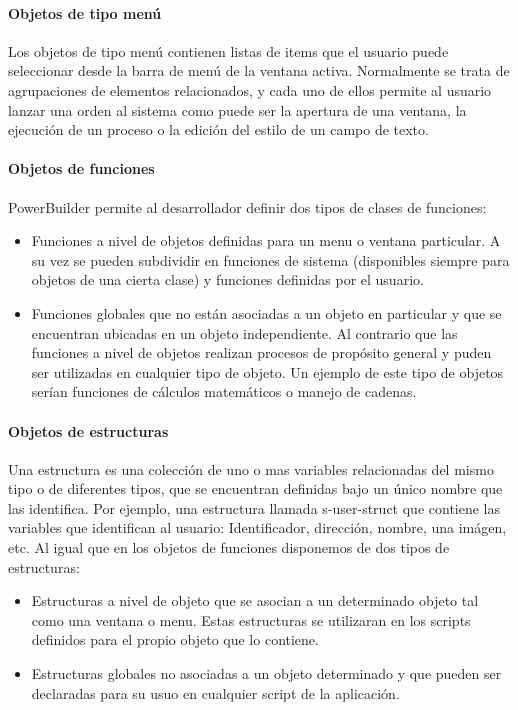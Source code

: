 {\paragraph{Objetos de tipo menú}
Los objetos de tipo menú contienen listas de items que el usuario puede seleccionar desde la barra de menú de la ventana activa. Normalmente se trata de agrupaciones de elementos 
relacionados, y cada uno de ellos permite al usuario lanzar una orden al sistema como puede ser la apertura de una ventana, la ejecución de un proceso o la edición del estilo de un campo de texto.
\paragraph{Objetos de funciones}
PowerBuilder permite al desarrollador definir dos tipos de clases de funciones: 
\begin{itemize}
 \item Funciones a nivel de objetos definidas para un menu o ventana particular. A su vez se pueden subdividir en funciones de sistema 
 (disponibles siempre para objetos de una cierta clase) y funciones definidas por el usuario.
 \item Funciones globales que no están asociadas a un objeto en particular y que se encuentran ubicadas en un objeto independiente. Al contrario que las funciones a nivel de objetos
 realizan procesos de propósito general y puden ser utilizadas en cualquier tipo de objeto. Un ejemplo de este tipo de objetos serían funciones de cálculos matemáticos o manejo de cadenas. 
\end{itemize}
\paragraph{Objetos de estructuras}
Una estructura es una colección de uno o mas variables relacionadas del mismo tipo o de diferentes tipos, que se encuentran definidas bajo un único nombre que las identifica.
Por ejemplo, una estructura llamada s-user-struct que contiene las variables que identifican al usuario: Identificador, dirección, nombre, una imágen, etc.
Al igual que en los objetos de funciones disponemos de dos tipos de estructuras:
\begin{itemize}
 \item Estructuras a nivel de objeto que se asocian a un determinado objeto tal como una ventana o menu. Estas estructuras se utilizaran en los scripts definidos para el propio objeto que lo contiene.
 \item Estructuras globales no asociadas a un objeto determinado y que pueden ser declaradas para su usuo en cualquier script de la aplicación.
\end{itemize}
}
